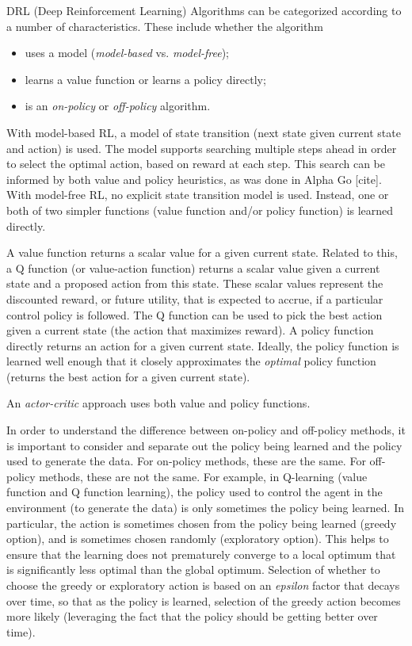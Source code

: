 \documentclass[acmlarge,screen]{acmart}
\begin{document}
DRL (Deep Reinforcement Learning) Algorithms can be categorized according to a number of characteristics.
These include whether the algorithm 

\begin{itemize}
\item uses a model (\textit{model-based} vs. \textit{model-free});
\item learns a value function or learns a policy directly;
\item is an \textit{on-policy} or \textit{off-policy} algorithm.
\end{itemize}

With model-based RL, a model of state transition (next state given current state
and action) is used.  The model supports searching multiple steps ahead in order to select the optimal action,
based on reward at each step.
This search can be informed by both value and policy heuristics, as was done in Alpha Go [cite].
With model-free RL, no explicit state transition model is used.
Instead, one or both of two simpler functions (value function and/or policy function) is learned directly.

A value function returns a scalar value for a given current state.  Related to this, a Q function (or value-action function)
returns a scalar value given a current state and a proposed action from this state.  
These scalar values represent the discounted reward, or future utility, that is expected to accrue, if a particular control
policy is followed.  The Q function can be used to pick the best action given a current state (the action that maximizes reward).
A policy function directly returns an action for a given current state.
Ideally, the policy function is learned well enough that it closely approximates the \textit{optimal} policy function
(returns the best action for a given current state).

An \textit{actor-critic} approach uses both value and policy functions.

In order to understand the difference between on-policy and off-policy methods, it is important to consider and separate out
the policy being learned and the policy used to generate the data.
For on-policy methods, these are the same.
For off-policy methods, these are not the same.
For example, in Q-learning (value function and Q function learning), the policy used to control the agent in the environment
(to generate the data) is only sometimes the policy being learned.  
In particular, the action is sometimes chosen from the policy being learned (greedy option), and is sometimes chosen randomly
(exploratory option).  
This helps to ensure that the learning does not prematurely converge to a local optimum that is significantly less optimal
than the global optimum.
Selection of whether to choose the greedy or exploratory action is based on an \textit{epsilon} factor that decays over time, 
so that as the policy is learned, selection of the greedy action becomes more likely
(leveraging the fact that the policy should be getting better over time).
\end{document}
